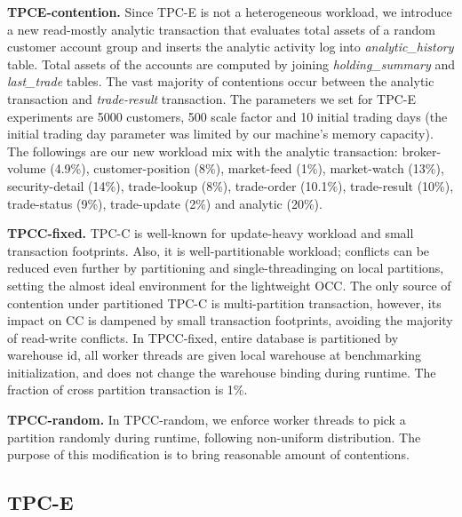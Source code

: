 \textbf{TPCE-contention.}
Since TPC-E is not a heterogeneous workload, we introduce a new read-mostly analytic transaction that evaluates total assets of a random customer account group and inserts the analytic activity log into \textit{analytic\_history} table. Total assets of the accounts are computed by joining \textit{holding\_summary} and \textit{last\_trade} tables. The vast majority of contentions occur between the analytic transaction and \textit{trade-result} transaction. The parameters we set for TPC-E experiments are 5000 customers, 500 scale factor and 10 initial trading days (the initial trading day parameter was limited by our machine's memory capacity). The followings are our new workload mix with the analytic transaction: broker-volume (4.9\%), customer-position (8\%), market-feed (1\%), market-watch (13\%), security-detail (14\%), trade-lookup (8\%), trade-order (10.1\%), trade-result (10\%), trade-status (9\%), trade-update (2\%) and analytic (20\%). 


\textbf{TPCC-fixed.}
TPC-C is well-known for update-heavy workload and small transaction footprints. Also, it is well-partitionable workload; conflicts can be reduced even further by partitioning and single-threadinging on local partitions, setting the almost ideal environment for the lightweight OCC. The only source of contention under partitioned TPC-C is multi-partition transaction, however, its impact on CC is dampened by small transaction footprints, avoiding the majority of read-write conflicts. In TPCC-fixed, entire database is partitioned by warehouse id, all worker threads are given local warehouse at benchmarking initialization, and does not change the warehouse binding during runtime. The fraction of cross partition transaction is 1\%. 


\textbf{TPCC-random.}
In TPCC-random, we enforce worker threads to pick a partition randomly during runtime, following non-uniform distribution. The purpose of this modification is to bring reasonable amount of contentions.  

\subsection{TPC-E}


